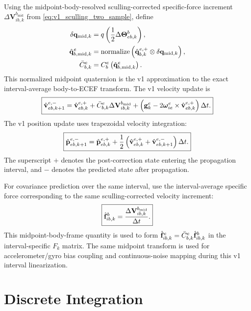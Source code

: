 Using the midpoint-body-resolved sculling-corrected specific-force increment
$\Delta\mathbf{V}_{ib,k}^{b_{\mathrm{mid}}}$ from
\cref{eq:v1_sculling_two_sample}, define
\begin{align}
\delta\mathbf{q}_{\mathrm{mid},k}
&=
q\left(\frac{1}{2}\Delta\boldsymbol\Theta_{eb,k}^{b}\right),\\
\hat{\mathbf{q}}_{b,\mathrm{mid},k}^{e}
&=
\operatorname{normalize}
\left(
\hat{\mathbf{q}}_{b,k}^{e,+}\otimes\delta\mathbf{q}_{\mathrm{mid},k}
\right),\\
\bar C_{b,k}^{e}
&=
C_b^e\left(\hat{\mathbf{q}}_{b,\mathrm{mid},k}^{e}\right).
\label{eq:v1_midpoint_attitude}
\end{align}
This normalized midpoint quaternion is the v1 approximation to the exact
interval-average body-to-ECEF transform. The v1 velocity update is
\begin{equation}
\boxed{
\hat{\mathbf{v}}_{eb,k+1}^{e,-}
=
\hat{\mathbf{v}}_{eb,k}^{e,+}
+
\bar C_{b,k}^{e}\Delta\mathbf{V}_{ib,k}^{b_{\mathrm{mid}}}
+
\left(
\mathbf{g}_k^e
-
2\boldsymbol{\omega}_{ie}^{e}\times\hat{\mathbf{v}}_{eb,k}^{e,+}
\right)\Delta t.
}
\label{eq:v1_discrete_velocity_update}
\end{equation}
The v1 position update uses trapezoidal velocity integration:
\begin{equation}
\boxed{
\hat{\mathbf{p}}_{eb,k+1}^{e,-}
=
\hat{\mathbf{p}}_{eb,k}^{e,+}
+
\frac{1}{2}
\left(
\hat{\mathbf{v}}_{eb,k}^{e,+}
+
\hat{\mathbf{v}}_{eb,k+1}^{e,-}
\right)
\Delta t.
}
\label{eq:v1_discrete_position_update}
\end{equation}
The superscript $+$ denotes the post-correction state entering the propagation
interval, and $-$ denotes the predicted state after propagation.

For covariance prediction over the same interval, use the interval-average
specific force corresponding to the same sculling-corrected velocity increment:
\begin{equation}
\boxed{
\hat{\mathbf{f}}_{ib,k}^{b}
=
\frac{\Delta\mathbf{V}_{ib,k}^{b_{\mathrm{mid}}}}{\Delta t}.
}
\label{eq:v1_interval_average_specific_force}
\end{equation}
This midpoint-body-frame quantity is used to form
$\hat{\mathbf{f}}_{ib,k}^{e}=\bar C_{b,k}^{e}\hat{\mathbf{f}}_{ib,k}^{b}$ in the
interval-specific $F_k$ matrix. The same midpoint transform is used for
accelerometer/gyro bias coupling and continuous-noise mapping during this v1
interval linearization.

\section{Discrete Integration}

